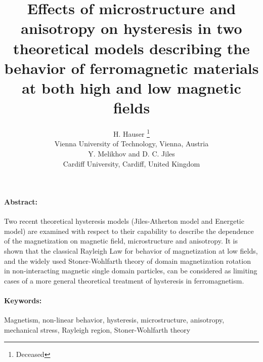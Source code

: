 \documentclass[12pt,fleqn]{article}
\begin{document}


\thispagestyle{empty}

\title
{\bf
Effects of microstructure and anisotropy on hysteresis in two theoretical models describing the behavior of ferromagnetic materials at both high and low magnetic fields
\\[0.5cm]
}
\author
{
               H. Hauser \footnote{Deceased}
\\
\normalsize
               Vienna University of Technology, Vienna, Austria
\\[0.5cm]
               Y. Melikhov and D. C. Jiles
\\
\normalsize
               Cardiff University, Cardiff, United Kingdom
\\
}
\date{} %

\maketitle
\thispagestyle{empty}

\cleardoublepage

\paragraph{Abstract:}

Two recent theoretical hysteresis models (Jiles-Atherton model and Energetic model) are examined with respect to their capability to describe the dependence of the magnetization on magnetic field, microstructure and anisotropy. It is shown that the classical Rayleigh Law for behavior of magnetization at low fields, and the widely used Stoner-Wohlfarth theory of domain magnetization rotation in non-interacting magnetic single domain particles, can be considered as limiting cases of a more general theoretical treatment of hysteresis in ferromagnetism.

\paragraph{Keywords:} Magnetism, non-linear behavior, hysteresis, microstructure, anisotropy, mechanical stress, Rayleigh region, Stoner-Wohlfarth theory

\cleardoublepage




\end{document}
